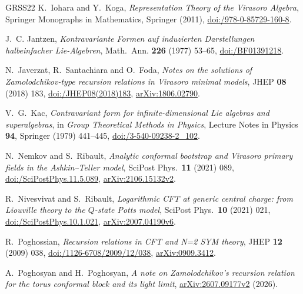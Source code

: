\documentclass[twoside,10pt]{article}
\numberwithin{equation}{section}
\theoremstyle{slbody}
\theoremstyle{definition}
\theoremstyle{remark}
\begin{document}
{\begin{thebibliography}{GRSS22}
K.~Iohara and Y.~Koga,
\emph{Representation Theory of the Virasoro Algebra},
Springer Monographs in Mathematics, Springer (2011),
\href{https://doi.org/10.1007/978-0-85729-160-8}%
{doi:/978-0-85729-160-8}.

J.~C. Jantzen,
\emph{Kontravariante Formen auf induzierten Darstellungen halbeinfacher
Lie-Algebren},
Math.\ Ann. \textbf{226} (1977) 53--65,
\href{https://doi.org/10.1007/BF01391218}%
{doi:/BF01391218}.

N.~Javerzat, R.~Santachiara and O.~Foda,
\emph{Notes on the solutions of Zamolodchikov-type recursion relations in
Virasoro minimal models},
JHEP \textbf{08} (2018) 183,
\href{https://doi.org/10.1007/JHEP08(2018)183}%
{doi:/JHEP08(2018)183},
\href{https://arxiv.org/abs/1806.02790}{arXiv:1806.02790}.

V.~G.~Kac,
\emph{Contravariant form for infinite-dimensional Lie algebras and
superalgebras},
in \emph{Group Theoretical Methods in Physics},
Lecture Notes in Physics \textbf{94}, Springer (1979) 441--445,
\href{https://doi.org/10.1007/3-540-09238-2_102}%
{doi:/3-540-09238-2\_102}.

N.~Nemkov and S.~Ribault,
\emph{Analytic conformal bootstrap and Virasoro primary fields in the
Ashkin--Teller model},
SciPost Phys.\ \textbf{11} (2021) 089,
\href{https://doi.org/10.21468/SciPostPhys.11.5.089}%
{doi:/SciPostPhys.11.5.089},
\href{https://arxiv.org/abs/2106.15132v2}{arXiv:2106.15132v2}.

R.~Nivesvivat and S.~Ribault,
\emph{Logarithmic {CFT} at generic central charge: from {L}iouville theory to
the {$Q$}-state {P}otts model},
SciPost Phys.\ \textbf{10} (2021) 021,
\href{https://doi.org/10.21468/SciPostPhys.10.1.021}%
{doi:/SciPostPhys.10.1.021},
\href{https://arxiv.org/abs/2007.04190v6}{arXiv:2007.04190v6}.

R.~Poghossian,
\emph{Recursion relations in CFT and N=2 SYM theory},
JHEP \textbf{12} (2009) 038,
\href{https://doi.org/10.1088/1126-6708/2009/12/038}%
{doi:/1126-6708/2009/12/038},
\href{https://arxiv.org/abs/0909.3412}{arXiv:0909.3412}.

A.~Poghosyan and H.~Poghosyan,
\emph{A note on Zamolodchikov's recursion relation for the torus
conformal block and its light limit},
\href{https://arxiv.org/abs/2607.09177v2}{arXiv:2607.09177v2} (2026).


\end{thebibliography}}
\end{document}
